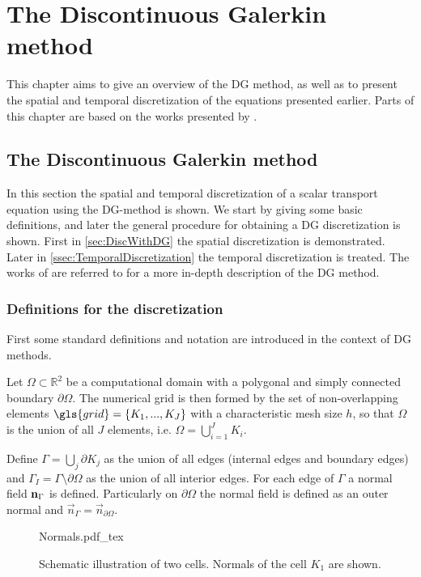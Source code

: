 \chapter{The Discontinuous Galerkin method}	\label{ch:NumericalMethods}
This chapter aims to give an overview of the DG method, as well as to present the spatial and temporal discretization of the equations presented earlier.  Parts of this chapter are based on the works presented by \textcite{kummerExtendedDiscontinuousGalerkin2017,kikkerFullyCoupledHighorder, smudamartinDirectNumericalSimulation2021}.

\section{The Discontinuous Galerkin method}
In this section the spatial and temporal discretization of a scalar transport equation using the DG-method is shown. We start by giving some basic definitions, and later the general procedure for obtaining a DG discretization is shown. First in \cref{sec:DiscWithDG} the spatial discretization is demonstrated. Later in \cref{ssec:TemporalDiscretization} the temporal discretization is treated. The works of \textcite{cockburnDevelopmentDiscontinuousGalerkin2000,hesthavenNodalDiscontinuousGalerkin2008,dipietroMathematicalAspectsDiscontinuous2012} are referred to for a more in-depth description of the DG method.
\subsection{Definitions for the discretization} \label{ssec:SpatDiscretization}
First some standard definitions and notation are introduced in the context of DG methods. 

Let $\Omega \subset \mathbb{R}^2$ be a computational domain with a polygonal and simply connected boundary $\partial \Omega$. The numerical grid is then formed by the set of non-overlapping elements $\gls{grid} = \{K_1, ..., K_J\}$ with a characteristic mesh size $h$, so that $\Omega$ is the union of all $J$ elements, i.e. $\Omega = \bigcup_{i=1}^J K_i$. 

Define $\Gamma = \bigcup_j \partial K_j$ as the union of all edges (internal edges and boundary edges) and $\Gamma_I = \Gamma \setminus \partial \Omega$ as the union of all interior edges.
For each edge of $\Gamma$ a normal field $\textbf{n}_{\Gamma}$ is defined. Particularly on $\partial \Omega$ the normal field is defined as an outer normal and $\vec{n}_\Gamma = \vec{n}_{\partial\Omega}$.
\begin{figure}[h]
	\begin{center}
		\def\svgwidth{0.5\textwidth}
		{Normals.pdf_tex}
		\caption{Schematic illustration of two cells. Normals of the cell $K_1$ are shown. }
		\label{fig:TwoCells}
	\end{center}
\end{figure}

